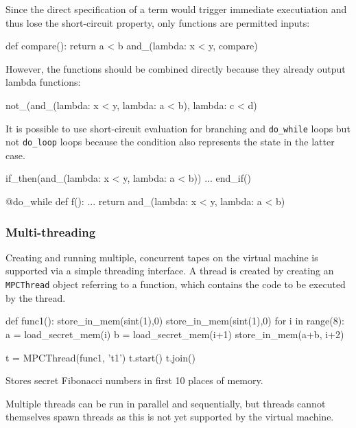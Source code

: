 Since the direct specification of a term would trigger immediate
executiation and thus lose the short-circuit property, only functions
are permitted inputs:

\begin{mylisting}
    def compare():
        return a < b
    and_(lambda: x < y, compare)
\end{mylisting}
However, the functions should be combined directly because they
already output lambda functions:

\begin{mylisting}
    not_(and_(lambda: x < y, lambda: a < b), lambda: c < d)
\end{mylisting}
It is possible to use short-circuit evaluation for branching and
\verb+do_while+ loops but not \verb+do_loop+ loops because the
condition also represents the state in the latter case.

\begin{mylisting}
if_then(and_(lambda: x < y, lambda: a < b))
...
end_if()

@do_while
def f():
    ...
    return and_(lambda: x < y, lambda: a < b)
\end{mylisting}

\subsubsection{Multi-threading}

Creating and running multiple, concurrent tapes on the virtual machine is
supported via a simple threading interface. A thread is created by creating
an \verb|MPCThread| object referring to a function, which contains the code
to be executed by the thread.

\begin{mylisting}
def func1():
    store_in_mem(sint(1),0)
    store_in_mem(sint(1),0)
    for i in range(8):
        a = load_secret_mem(i)
        b = load_secret_mem(i+1)
        store_in_mem(a+b, i+2)

t = MPCThread(func1, 't1')
t.start()
t.join()
\end{mylisting}
\begin{footnotesize}
Stores secret Fibonacci numbers in first 10 places of memory. \\
\end{footnotesize}
Multiple threads can be run in parallel and sequentially, but threads cannot
themselves spawn threads as this is not yet supported by the virtual machine.

